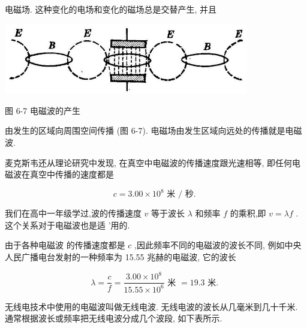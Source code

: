 \documentclass[10pt]{article}
\begin{document}
电磁场. 这种变化的电场和变化的磁场总是交替产生, 并且

\begin{center}
\includegraphics[max width=0.8\textwidth]{images/01913056-1f15-74d8-9184-9aab52c9d66b_200_901268.jpg}
\end{center}

图 6-7 电磁波的产生

由发生的区域向周围空间传播 (图 6-7). 电磁场由发生区域向远处的传播就是电磁波.

麦克斯韦还从理论研究中发现, 在真空中电磁波的传播速度跟光速相等, 即任何电磁波在真空中传播的速度都是

\[
c = {3.00} \times {10}^{8}\text{ 米 }/\text{ 秒. }
\]

我们在高中一年级学过,波的传播速度 \(v\) 等于波长 \(\lambda\) 和频率 \(f\) 的乘积,即 \(v = {\lambda f}\) . 这个关系对于电磁波也是适 ’用的.

由于各种电磁波 的传播速度都是 \(c\) ,因此频率不同的电磁波的波长不同, 例如中央人民广播电台发射的一种频率为 15.55 兆赫的电磁波, 它的波长

\[
\lambda = \frac{c}{f} = \frac{{3.00} \times {10}^{8}}{{15.55} \times {10}^{6}}\text{ 米 } = {19.3}\text{ 米. }
\]

无线电技术中使用的电磁波叫做无线电波. 无线电波的波长从几毫米到几十千米. 通常根据波长或频率把无线电波分成几个波段, 如下表所示.

\begin{center}
\end{center}
\end{document}
